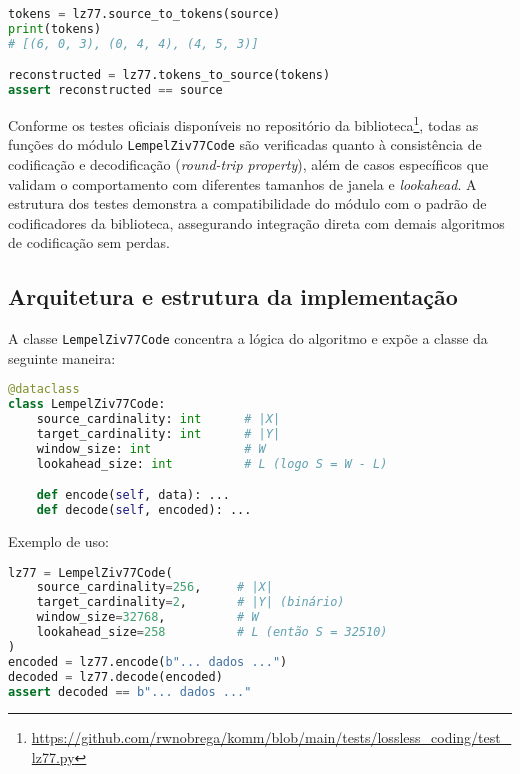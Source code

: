 \begin{lstlisting}[language=Python, caption={Conversão intermediária entre sequência e tokens.}]
tokens = lz77.source_to_tokens(source)
print(tokens)
# [(6, 0, 3), (0, 4, 4), (4, 5, 3)]

reconstructed = lz77.tokens_to_source(tokens)
assert reconstructed == source
\end{lstlisting}

Conforme os testes oficiais disponíveis no repositório da
biblioteca\footnote{\url{https://github.com/rwnobrega/komm/blob/main/tests/lossless_coding/test_lz77.py}},
todas as funções do módulo \texttt{LempelZiv77Code} são verificadas quanto à
consistência de codificação e decodificação (\emph{round-trip property}), além
de casos específicos que validam o comportamento com diferentes tamanhos de
janela e \textit{lookahead}. A estrutura dos testes demonstra a compatibilidade
do módulo com o padrão de codificadores da biblioteca, assegurando integração
direta com demais algoritmos de codificação sem perdas.


\subsection{Arquitetura e estrutura da implementação}

A classe \texttt{LempelZiv77Code} concentra a lógica do algoritmo e expõe a
classe da seguinte maneira:
\begin{lstlisting}[language=Python, caption={Estrutura simplificada da classe LZ77}]
@dataclass
class LempelZiv77Code:
    source_cardinality: int      # |X|
    target_cardinality: int      # |Y|
    window_size: int             # W
    lookahead_size: int          # L (logo S = W - L)

    def encode(self, data): ...
    def decode(self, encoded): ...
\end{lstlisting}

Exemplo de uso:
\begin{lstlisting}[language=Python, caption={Uso típico do LZ77 com a documentação acessível em \url{} \textit{Komm}}]
lz77 = LempelZiv77Code(
    source_cardinality=256,     # |X|
    target_cardinality=2,       # |Y| (binário)
    window_size=32768,          # W
    lookahead_size=258          # L (então S = 32510)
)
encoded = lz77.encode(b"... dados ...")
decoded = lz77.decode(encoded)
assert decoded == b"... dados ..."
\end{lstlisting}

